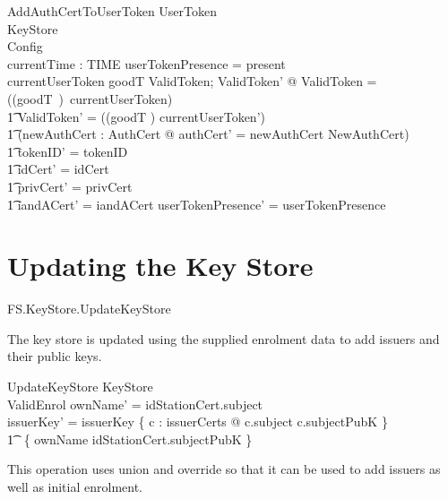 \begin{schema}{AddAuthCertToUserToken}
        \Delta UserToken
\\      KeyStore
\\      Config
\\      currentTime : TIME
\where
        userTokenPresence = present
\\      currentUserToken \in \ran goodT
\also
      \exists ValidToken; ValidToken' @ \theta ValidToken = ((goodT~\inv)~currentUserToken) 
\\ \t1  \land \theta ValidToken' = ((goodT \inv) currentUserToken')
\\ \t1  \land (\exists newAuthCert : AuthCert @ \The authCert' = newAuthCert
        \land NewAuthCert)
\\ \t1  \land tokenID' = tokenID
\\ \t1  \land idCert' = idCert
\\ \t1  \land privCert' = privCert
\\ \t1  \land iandACert' = iandACert
\also
        userTokenPresence' = userTokenPresence
\end{schema}


\section{Updating the Key Store}

\begin{traceunit}{FS.KeyStore.UpdateKeyStore}
\end{traceunit}


The key store is updated using the supplied enrolment data 
to add issuers and their public keys.

\begin{schema}{UpdateKeyStore}
        \Delta KeyStore
\\      ValidEnrol
\where
        \The ownName' = idStationCert.subject
\\      issuerKey' = issuerKey \oplus\{ c : issuerCerts @ c.subject \mapsto c.subjectPubK
        \}
\\      \t1     \oplus ~\{ \The ownName \mapsto idStationCert.subjectPubK \} 
\end{schema}
\begin{Zcomment}
\item
This operation uses union and override so that it can be used to add
issuers as well as initial enrolment. 
\end{Zcomment}

